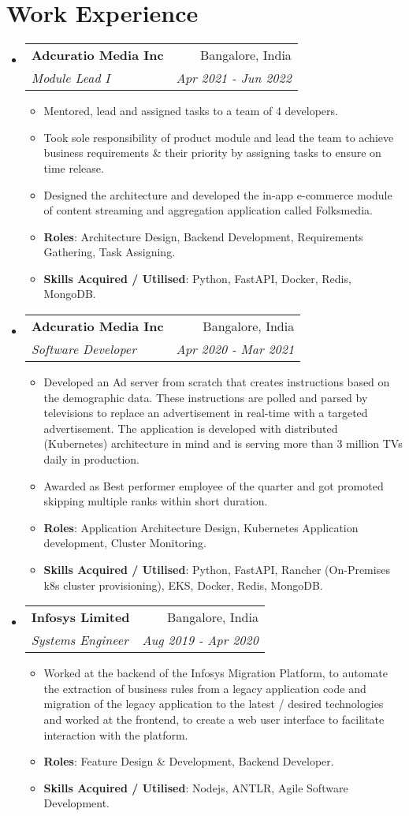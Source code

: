 \documentclass[a4paper,20pt]{article}
\makeatletter
\newcommand{\resumeItem}[2]{
  \item\small{
    \textbf{#1}{: #2 \vspace{-2pt}}
  }
}
\newcommand{\resumeItemWithoutTitle}[1]{
  \item\small{
    {#1\vspace{-2pt}}
  }
}
\newcommand{\resumeSubheading}[4]{
  \vspace{-1pt}\item
    \begin{tabular*}{0.97\textwidth}{l@{\extracolsep{\fill}}r}
      \textbf{#1} & #2 \\
      \textit{#3} & \textit{#4} \\
    \end{tabular*}\vspace{-5pt}
}
\newcommand{\resumeSubHeadingListStart}{\begin{itemize}[leftmargin=*]}
\newcommand{\resumeSubHeadingListEnd}{\end{itemize}}
\newcommand{\resumeItemListStart}{\begin{itemize}}
\newcommand{\resumeItemListEnd}{\end{itemize}\vspace{-5pt}}
\makeatother
\begin{document}
\section{Work Experience}
\resumeSubHeadingListStart
\resumeSubheading
{Adcuratio Media Inc}{Bangalore, India}
{Module Lead I}{Apr 2021 - Jun 2022}
\resumeItemListStart
\resumeItemWithoutTitle{Mentored, lead and assigned tasks to a team of 4 developers.}
\resumeItemWithoutTitle{Took sole responsibility of product module and lead the team to achieve business requirements \& their priority by assigning tasks to ensure on time release.}
\resumeItemWithoutTitle{Designed the architecture and developed the in-app e-commerce module of content streaming and aggregation application called Folksmedia.}
\resumeItem{Roles}{Architecture Design, Backend Development, Requirements Gathering, Task Assigning.}
\resumeItem{Skills Acquired / Utilised}{Python, FastAPI, Docker, Redis, MongoDB.}
\resumeItemListEnd
\vspace{2pt}
\resumeSubheading
{Adcuratio Media Inc}{Bangalore, India}
{Software Developer}{Apr 2020 - Mar 2021}
\resumeItemListStart
\resumeItemWithoutTitle{Developed an Ad server from scratch that creates instructions based on the demographic data. These instructions are polled and parsed by televisions to replace an advertisement in real-time with a targeted advertisement. The application is developed with distributed (Kubernetes) architecture in mind and is serving more than 3 million TVs daily in production.}
\resumeItemWithoutTitle{Awarded as Best performer employee of the quarter and got promoted skipping multiple ranks within short duration.}
\resumeItem{Roles}{Application Architecture Design, Kubernetes Application development, Cluster Monitoring.}
\resumeItem{Skills Acquired / Utilised}{Python, FastAPI, Rancher (On-Premises k8s cluster provisioning), EKS, Docker, Redis, MongoDB.}
\resumeItemListEnd
\vspace{2pt}
\resumeSubheading
{Infosys Limited}{Bangalore, India}
{Systems Engineer}{Aug 2019 - Apr 2020}
\resumeItemListStart
\resumeItemWithoutTitle{Worked at the backend of the Infosys Migration Platform, to automate the extraction of business rules from a legacy application code and migration of the legacy application to the latest / desired technologies and worked at the frontend, to create a web user interface to facilitate interaction with the platform.}
\resumeItem{Roles}{Feature Design \& Development, Backend Developer.}
\resumeItem{Skills Acquired / Utilised}{Nodejs, ANTLR, Agile Software Development.}
\resumeItemListEnd
\resumeSubHeadingListEnd
\vspace{-5pt}
\end{document}
